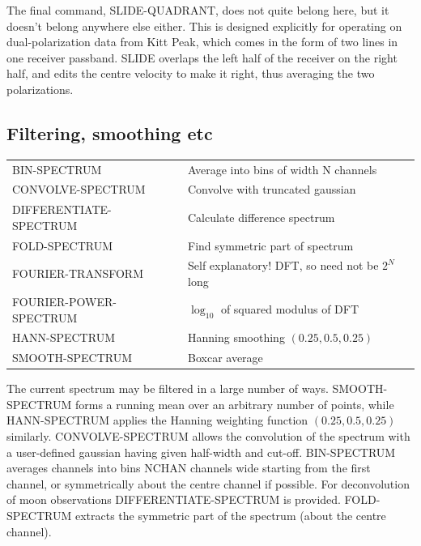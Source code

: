 \documentclass[11pt,twoside]{report}
\begin{document}
The final command, SLIDE-QUADRANT, does not quite belong here, but it doesn't
belong anywhere else either. This is designed explicitly for operating on
dual-polarization data from Kitt Peak, which comes in the form of two lines
in one receiver passband. SLIDE overlaps the left half of the receiver on the
right half, and edits the centre velocity to make it right, thus averaging
the two polarizations.

\subsection{Filtering, smoothing etc}  

\begin{tabular}{ll}
BIN-SPECTRUM             & Average into bins of width N channels\\
CONVOLVE-SPECTRUM        & Convolve with truncated gaussian\\
DIFFERENTIATE-SPECTRUM   & Calculate difference spectrum\\
FOLD-SPECTRUM            & Find symmetric part of spectrum\\
FOURIER-TRANSFORM        & Self explanatory! DFT, so need not be $2^N$ long\\
FOURIER-POWER-SPECTRUM   & $\log_{10}$ of squared modulus of DFT\\
HANN-SPECTRUM            & Hanning smoothing $(0.25,0.5,0.25)$\\
SMOOTH-SPECTRUM          & Boxcar average\\
\end{tabular}

The current spectrum may be filtered in a large number of ways. SMOOTH-SPECTRUM
forms a running mean  over an arbitrary number of points,
while HANN-SPECTRUM applies the Hanning  weighting function
$(0.25, 0.5, 0.25)$ similarly. CONVOLVE-SPECTRUM allows the convolution
of the spectrum with a user-defined gaussian
having given half-width and cut-off. BIN-SPECTRUM  averages
channels into bins NCHAN channels wide starting from the first channel, or
symmetrically about the centre channel if possible. For deconvolution
 of moon  observations \etc
DIFFERENTIATE-SPECTRUM is provided. FOLD-SPECTRUM extracts the symmetric part
of the spectrum (about
the centre channel). 
\end{document}
